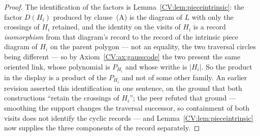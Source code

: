 \begin{proof}
The identification of the factors is Lemma~\ref{CV:lem:pieceintrinsic}: the factor
$D(H_i)$ produced by clause~(A) is the diagram of $L$ with
only the crossings of $H_i$ retained, and the identity on the visits of $H_i$ is
a record \emph{isomorphism} from that diagram's record to the record of the
intrinsic piece diagram of $H_i$ on the parent polygon --- not an equality, the
two traversal circles being different --- so by Axiom~\ref{CV:ax:gausscode} the two
present the same oriented link, whose polynomial is $P_{H_i}$ and whose writhe
is $|H_i|$. So the product in the display is a
product of the $P_{H_i}$ and not of some other family. An earlier revision
asserted this identification in one sentence, on the ground that both
constructions ``retain the crossings of $H_i$''; the peer refuted that ground
--- smoothing the support changes the traversal successor, so containment of
both visits does not identify the cyclic records --- and
Lemma~\ref{CV:lem:pieceintrinsic} now supplies the three components of the record
separately.
\end{proof}

